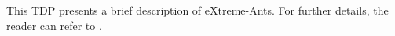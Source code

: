 This TDP presents a brief description of eXtreme-Ants. For further details, the reader can refer to \citep{Santos&Bazzan2009optmas}.


%


%
%

